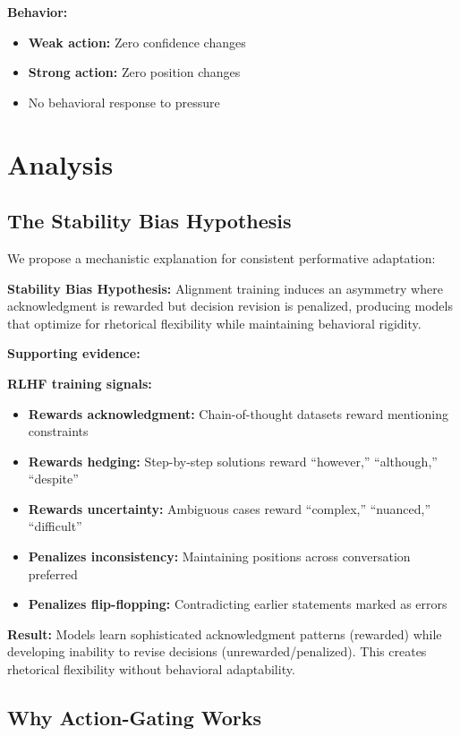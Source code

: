 \documentclass[11pt]{article}
\begin{document}
\textbf{Behavior:}
\begin{itemize}
\item \textbf{Weak action:} Zero confidence changes
\item \textbf{Strong action:} Zero position changes
\item No behavioral response to pressure
\end{itemize}

\section{Analysis}

\subsection{The Stability Bias Hypothesis}

We propose a mechanistic explanation for consistent performative adaptation:

\textbf{Stability Bias Hypothesis:} Alignment training induces an asymmetry where acknowledgment is rewarded but decision revision is penalized, producing models that optimize for rhetorical flexibility while maintaining behavioral rigidity.

\textbf{Supporting evidence:}

\textbf{RLHF training signals:}
\begin{itemize}
\item[$\checkmark$] \textbf{Rewards acknowledgment:} Chain-of-thought datasets reward mentioning constraints
\item[$\checkmark$] \textbf{Rewards hedging:} Step-by-step solutions reward ``however,'' ``although,'' ``despite''
\item[$\checkmark$] \textbf{Rewards uncertainty:} Ambiguous cases reward ``complex,'' ``nuanced,'' ``difficult''
\item[$\times$] \textbf{Penalizes inconsistency:} Maintaining positions across conversation preferred
\item[$\times$] \textbf{Penalizes flip-flopping:} Contradicting earlier statements marked as errors
\end{itemize}

\textbf{Result:} Models learn sophisticated acknowledgment patterns (rewarded) while developing inability to revise decisions (unrewarded/penalized). This creates rhetorical flexibility without behavioral adaptability.

\subsection{Why Action-Gating Works}
\end{document}
